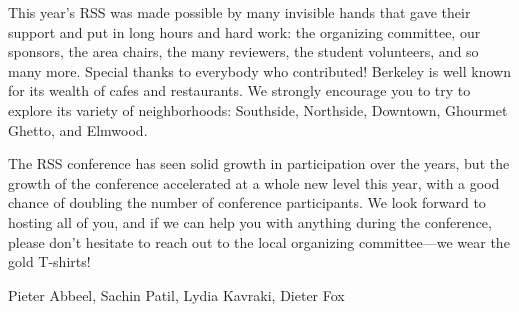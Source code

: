 This year’s RSS was made possible by many invisible hands that gave their support and put in long hours and hard work: the organizing committee, our sponsors, the area chairs, the many reviewers, the student volunteers, and so many more.  Special thanks to everybody who contributed! Berkeley is well known for its wealth of cafes and restaurants.  We strongly encourage you to try to explore its variety of neighborhoods: Southside, Northside, Downtown, Ghourmet Ghetto, and Elmwood.

\vspace{1mm}

The RSS conference has seen solid growth in participation over the years, but the growth of the conference accelerated at a whole new level this year, with a good chance of doubling the number of conference participants.  We look forward to hosting all of you, and if we can help you with anything during the conference, please don’t hesitate to reach out to the local organizing committee—we wear the gold T-shirts!  

\vspace{1cm}

Pieter Abbeel, Sachin Patil, Lydia Kavraki, Dieter Fox
%
\endgroup{}
\normalsize

